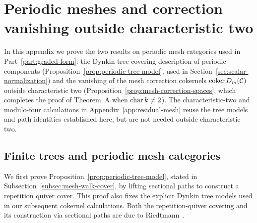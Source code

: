 \section{Periodic meshes and correction vanishing outside characteristic two}
\label{app:periodic-mesh}

In this appendix we prove the two results on periodic mesh categories used in Part~\ref{part:graded-form}: the Dynkin-tree covering description of periodic components (Proposition~\ref{prop:periodic-tree-model}, used in Section~\ref{sec:scalar-normalization}) and the vanishing of the mesh correction cokernels $\operatorname{coker}D_m(\mathcal C)$ outside characteristic two (Proposition~\ref{prop:mesh-correction-spaces}, which completes the proof of Theorem~A when $\operatorname{char} k\ne2$). The characteristic-two and modulo-four calculations in Appendix~\ref{app:residual-mesh} reuse the tree models and path identities established here, but are not needed outside characteristic two.

\subsection{Finite trees and periodic mesh categories}
\label{app:periodic-trees}

We first prove Proposition~\ref{prop:periodic-tree-model}, stated in Subsection~\ref{subsec:mesh-walk-cover}, by lifting sectional paths to construct a repetition quiver cover. This proof also fixes the explicit Dynkin tree models used in our subsequent cokernel calculations. Both the repetition-quiver covering and its construction via sectional paths are due to Riedtmann~\cite[Sections~1.5--1.6 and~2.1]{Riedtmann1980}.


